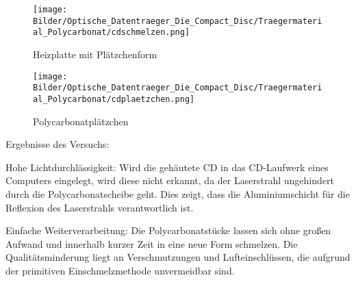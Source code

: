 {    \begin{figure}[H]
        \begin{center}
            \begin{minipage}[t]{0.45\textwidth}
                \begin{center}
                    \texttt{[image: Bilder/Optische\_Datentraeger\_Die\_Compact\_Disc/Traegermaterial\_Polycarbonat/cdschmelzen.png]}
                    \caption[Heizplatte mit Plätzchenform]{Heizplatte mit Plätzchenform}
                    \label{fig:cdschmelzen}
                \end{center}
            \end{minipage}
            \hspace{0.025\textwidth}
            \begin{minipage}[t]{0.45\textwidth}
                \begin{center}
                    \texttt{[image: Bilder/Optische\_Datentraeger\_Die\_Compact\_Disc/Traegermaterial\_Polycarbonat/cdplaetzchen.png]}
                    \caption[\glqq Polycarbonatplätzchen\grqq{}]{\glqq Polycarbonatplätzchen\grqq{}}
                    \label{fig:cdplaetzchen}
                \end{center}
            \end{minipage}
        \end{center}
    \end{figure}
}{}

Ergebnisse des Versuchs:
\begin{enumerate*}
    \item Hohe Lichtdurchlässigkeit: Wird die \glqq gehäutete\grqq{} CD in das CD-Laufwerk eines Computers eingelegt, wird diese nicht erkannt, da der Laserstrahl ungehindert durch die Polycarbonatscheibe geht. Dies zeigt, dass die Aluminiumschicht für die Reflexion des Laserstrahls verantwortlich ist.
    \item Einfache Weiterverarbeitung: Die Polycarbonatstücke lassen sich ohne großen Aufwand und innerhalb kurzer Zeit in eine neue Form schmelzen. Die Qualitätsminderung liegt an Verschmutzungen und Lufteinschlüssen, die aufgrund der primitiven Einschmelzmethode unvermeidbar sind.
\end{enumerate*}
